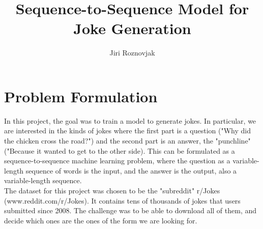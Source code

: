 \documentclass[12pt]{article}
\title{Sequence-to-Sequence Model for Joke Generation}
\author{Jiri Roznovjak}
\begin{document}

\newcommand{\hmwkClass}{CS 201 Final Project}
\newcommand{\hmwkSemester}{Fall 2016}

\newcommand{\hmwkAuthorName}{Jiri Roznovjak}
\newcommand{\hmwkAuthorID}{jroznovjak}

\newcommand{\hmwkAssignmentNum}{1}

\newcommand{\hmwkProblemNum}{1}

\newcommand{\hmwkCollaborators}{}



\maketitle

\section{Problem Formulation}

In this project, the goal was to train a model to generate jokes. In particular, we are interested in the kinds of jokes where the first part is a question ("Why did the chicken cross the road?") and the second part is an answer, the "punchline" ("Because it wanted to get to the other side). This can be formulated as a sequence-to-sequence machine learning problem, where the question as a variable-length sequence of words is the input, and the answer is the output, also a variable-length sequence. \\

The dataset for this project was chosen to be the "subreddit" r/Jokes (www.reddit.com/r/Jokes). It contains tens of thousands of jokes that users submitted since 2008. The challenge was to be able to download all of them, and decide which ones are the ones of the form we are looking for. \\
\end{document}
